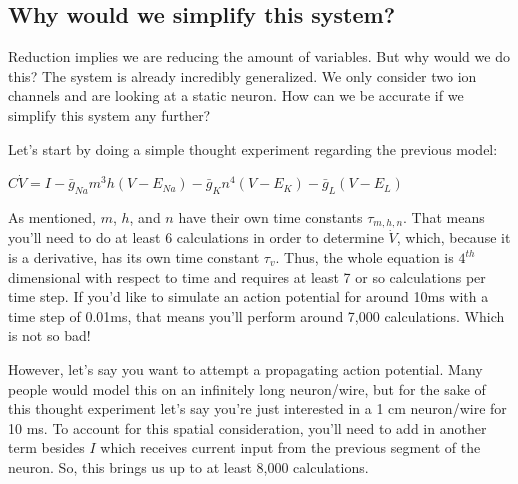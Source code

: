 \subsection{Why would we simplify this system?} Reduction implies we are reducing the amount of variables. But why would we do this? The system is already incredibly generalized. We only consider two ion channels and are looking at a static neuron. How can we be accurate if we simplify this system any further?\newline

Let's start by doing a simple thought experiment regarding the previous model: 

\bigskip

\begin{center}

    $C\dot{V} = I - \bar{g}_{Na}m^3h(V - E_{Na}) - \bar{g}_{K}n^4(V - E_{K}) - \bar{g}_{L}(V - E_{L})$
    
\end{center}

\bigskip

As mentioned, $m$, $h$, and $n$ have their own time constants $\tau_{m,h,n}$. That means you'll need to do at least 6 calculations in order to determine $\dot{V}$, which, because it is a derivative, has its own time constant $\tau_v$. Thus, the whole equation is $4^{th}$ dimensional with respect to time and requires at least 7 or so calculations per time step. If you'd like to simulate an action potential for around 10ms with a time step of 0.01ms, that means you'll perform around 7,000 calculations. Which is not so bad!\newline 

However, let's say you want to attempt a propagating action potential. Many people would model this on an infinitely long neuron/wire, but for the sake of this thought experiment let's say you're just interested in a 1 cm neuron/wire for 10 ms. To account for this spatial consideration, you'll need to add in another term besides $I$ which receives current input from the previous segment of the neuron. So, this brings us up to at least 8,000 calculations.\newline

